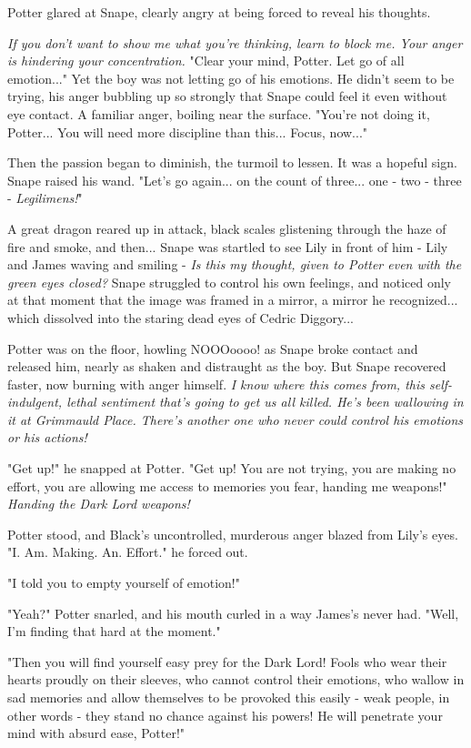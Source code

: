 \documentclass[a4paper,11pt]{article}
\begin{document}
Potter glared at Snape, clearly angry at being forced to reveal his thoughts.

\emph{If you don't want to show me what you're thinking, learn to block me. Your anger is hindering your concentration.} "Clear your mind, Potter. Let go of all emotion..." Yet the boy was not letting go of his emotions. He didn't seem to be trying, his anger bubbling up so strongly that Snape could feel it even without eye contact. A familiar anger, boiling near the surface. "You're not doing it, Potter... You will need more discipline than this... Focus, now..."

Then the passion began to diminish, the turmoil to lessen. It was a hopeful sign. Snape raised his wand. "Let's go again... on the count of three... one - two - three - \emph{Legilimens!}"

A great dragon reared up in attack, black scales glistening through the haze of fire and smoke, and then... Snape was startled to see Lily in front of him - Lily and James waving and smiling - \emph{Is this my thought, given to Potter even with the green eyes closed?} Snape struggled to control his own feelings, and noticed only at that moment that the image was framed in a mirror, a mirror he recognized... which dissolved into the staring dead eyes of Cedric Diggory...

Potter was on the floor, howling NOOOoooo! as Snape broke contact and released him, nearly as shaken and distraught as the boy. But Snape recovered faster, now burning with anger himself. \emph{I know where this comes from, this self-indulgent, lethal sentiment that's going to get us all killed. He's been wallowing in it at Grimmauld Place. There's another one who never could control his emotions or his actions!}

"Get up!" he snapped at Potter. "Get up! You are not trying, you are making no effort, you are allowing me access to memories you fear, handing me weapons!" \emph{Handing the Dark Lord weapons!}

Potter stood, and Black's uncontrolled, murderous anger blazed from Lily's eyes. "I. Am. Making. An. Effort." he forced out.

"I told you to empty yourself of emotion!"

"Yeah?" Potter snarled, and his mouth curled in a way James's never had. "Well, I'm finding that hard at the moment."

"Then you will find yourself easy prey for the Dark Lord! Fools who wear their hearts proudly on their sleeves, who cannot control their emotions, who wallow in sad memories and allow themselves to be provoked this easily - weak people, in other words - they stand no chance against his powers! He will penetrate your mind with absurd ease, Potter!"
\end{document}
